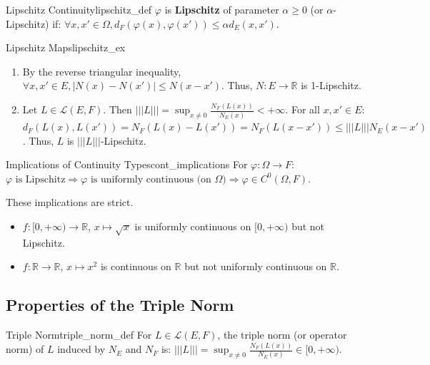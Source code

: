 \documentclass[11pt, a4paper]{article}
\newcommand{\R}{\mathbb{R}}
\begin{document}
\begin{definition}{Lipschitz Continuity}{lipschitz_def}
$\varphi$ is \textbf{Lipschitz} of parameter $\alpha \ge 0$ (or $\alpha$-Lipschitz) if:
$\forall x, x' \in \Omega, d_F(\varphi(x), \varphi(x')) \le \alpha d_E(x, x')$.
\end{definition}

\begin{example}{Lipschitz Maps}{lipschitz_ex}
\begin{enumerate}
    \item By the reverse triangular inequality, $\forall x, x' \in E, |N(x) - N(x')| \le N(x - x')$. Thus, $N: E \to \R$ is 1-Lipschitz.
    \item Let $L \in \mathcal{L}(E, F)$. Then $|||L||| = \sup_{x \neq 0} \frac{N_F(L(x))}{N_E(x)} < +\infty$.
    For all $x, x' \in E$:
    $d_F(L(x), L(x')) = N_F(L(x) - L(x')) = N_F(L(x - x')) \le |||L||| N_E(x - x')$.
    Thus, $L$ is $|||L|||$-Lipschitz.
\end{enumerate}
\end{example}

\begin{proposition}{Implications of Continuity Types}{cont_implications}
For $\varphi: \Omega \to F$:
$\varphi \text{ is Lipschitz} \Rightarrow \varphi \text{ is uniformly continuous (on } \Omega) \Rightarrow \varphi \in C^0(\Omega, F)$.
\end{proposition}
\begin{remark}{}{}
These implications are strict.
\begin{itemize}
    \item $f: [0, +\infty) \to \R$, $x \mapsto \sqrt{x}$ is uniformly continuous on $[0, +\infty)$ but not Lipschitz.
    \item $f: \R \to \R$, $x \mapsto x^2$ is continuous on $\R$ but not uniformly continuous on $\R$.
\end{itemize}
\end{remark}

\subsection{Properties of the Triple Norm}
\begin{definition}{Triple Norm}{triple_norm_def}
For $L \in \mathcal{L}(E, F)$, the triple norm (or operator norm) of $L$ induced by $N_E$ and $N_F$ is:
$|||L||| = \sup_{x \neq 0} \frac{N_F(L(x))}{N_E(x)} \in [0, +\infty)$.
\end{definition}
\end{document}
